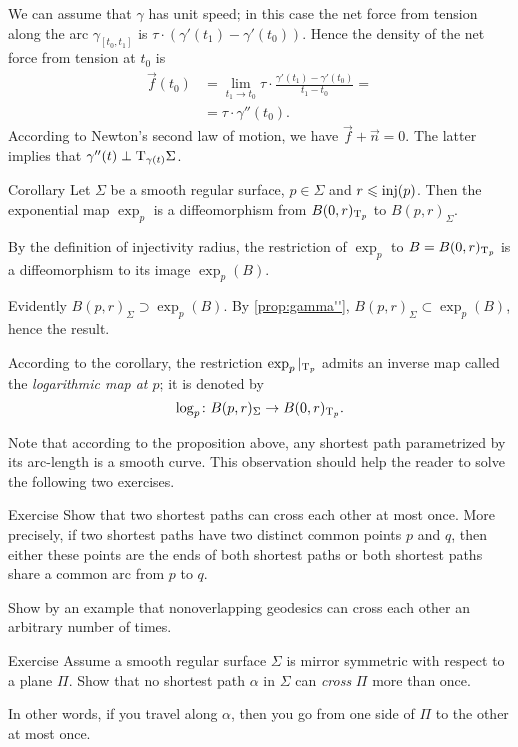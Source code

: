 We can assume that $\gamma$ has unit speed;
in this case the net force from tension along the arc $\gamma_{[t_0,t_1]}$ is $\tau\cdot(\gamma'(t_1)-\gamma'(t_0))$.
Hence the density of the net force from tension at $t_0$ is 
\begin{align*}
\vec f(t_0)&=\lim_{t_1\to t_0}\tau\cdot\frac{\gamma'(t_1)-\gamma'(t_0)}{t_1-t_0}=
\\
&=\tau\cdot\gamma''(t_0).
\end{align*}
According to Newton's second law of motion, we have 
$\vec f+\vec n=0$.
The latter implies that  $\gamma''(t)\perp\mathrm{T}_{\gamma(t)}\Sigma$.
\qeds

\begin{thm}{Corollary}
Let $\Sigma$ be a smooth regular surface, $p\in\Sigma$ and $r\z\le \inj(p)$.
Then  the exponential map $\exp_p$ is a diffeomorphism from $B(0,r)_{\mathrm{T}_p}$ to $B(p,r)_\Sigma$.
\end{thm}

By the definition of injectivity radius, the restriction of $\exp_p$ to $B={B(0,r)_{\mathrm{T}_p}}$ is a diffeomorphism to its image $\exp_p(B)$.

Evidently $B(p,r)_\Sigma\supset\exp_p(B)$.
By \ref{prop:gamma''}, $B(p,r)_\Sigma\subset\exp_p(B)$, hence the result.
\qeds

According to the corollary, the restriction $\exp_p|_{\mathrm{T}_p}$ admits an inverse map  called the \emph{logarithmic map at $p$};
it is denoted by \[\log_p\colon B(p,r)_\Sigma\to B(0,r)_{\mathrm{T}_p}.\]

Note that according to the proposition above, any shortest path parametrized by its arc-length is a smooth curve.
This observation should help the reader to solve the following two exercises.


\begin{thm}{Exercise}\label{ex:two-min-geod}
Show that two shortest paths can cross each other at most once.
More precisely, if two shortest paths have two distinct common points $p$ and $q$, then either these points are the ends of both shortest paths or both shortest paths share a common arc from $p$ to $q$.

Show by an example that nonoverlapping geodesics can cross each other an arbitrary number of times.
\end{thm}

\begin{thm}{Exercise}\label{ex:min-geod+plane}
Assume a smooth regular surface $\Sigma$ is mirror symmetric with respect to a plane $\Pi$.
Show that no shortest path $\alpha$ in $\Sigma$ can {}\emph{cross} $\Pi$ more than once.


In other words, if you travel along $\alpha$, then you go from one side  of $\Pi$ to the other at most once. 
\end{thm}

